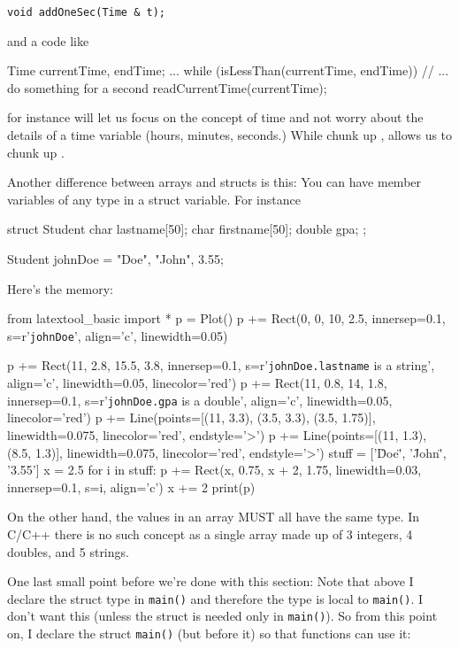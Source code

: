 \begin{center}
\begin{center}
\verb!void addOneSec(Time & t);!

and a code like

\begin{consolethree}[escapeinside=||]
Time currentTime, endTime;
...
while (isLessThan(currentTime, endTime))
{
    // ... do something for a second
    readCurrentTime(currentTime);
}
\end{consolethree}

for instance will let us focus on the concept of time and not worry
about the details of a time variable (hours, minutes, seconds.) While
 chunk up , 
allows us to chunk up .


Another difference between arrays and structs is this: You can have
member variables of any type in a struct variable. For instance

\begin{consolethree}[escapeinside=||]
struct Student
{
    char lastname[50];
    char firstname[50];
    double gpa;
};

Student johnDoe = {"Doe", "John", 3.55};
\end{consolethree}

Here's the memory:
\begin{python}
from latextool_basic import *
p = Plot()
p += Rect(0, 0, 10, 2.5, innersep=0.1, s=r'{\tt    johnDoe}', align='c', linewidth=0.05)

p += Rect(11, 2.8, 15.5, 3.8, innersep=0.1, s=r'{\tt johnDoe.lastname} is a string', align='c', linewidth=0.05, linecolor='red')
p += Rect(11, 0.8, 14, 1.8, innersep=0.1, s=r'{\tt johnDoe.gpa} is a double', align='c', linewidth=0.05, linecolor='red')
p += Line(points=[(11, 3.3), (3.5, 3.3), (3.5, 1.75)], linewidth=0.075, linecolor='red', endstyle='>')
p += Line(points=[(11, 1.3), (8.5, 1.3)], linewidth=0.075, linecolor='red', endstyle='>')
stuff = ['\"Doe\"', '\"John\"', '3.55']
x = 2.5
for i in stuff:
    p += Rect(x, 0.75, x + 2, 1.75, linewidth=0.03, innersep=0.1, s=i, align='c')
    x += 2
print(p)
\end{python}
On the other hand, the values in an array MUST all have the same type.
In C/C++ there is no such concept as a single array made up of 3
integers, 4 doubles, and 5 strings.






One last small point before we're done with this
section: Note that above I declare the struct type in \texttt{main()} and
therefore the type is local to \texttt{main()}. I don't want this
(unless the struct is needed only in \texttt{main()}). So from this point
on, I declare the struct  \texttt{main()} (but before it)
so that  functions can use it:


\end{center}
\end{center}
